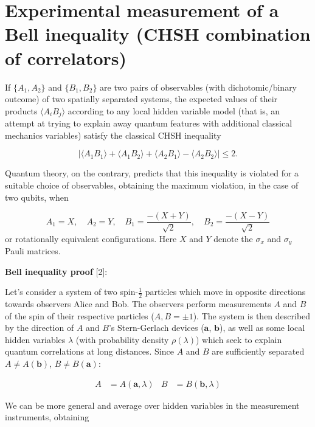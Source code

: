 \documentclass[11pt,dvipsnames]{article}
\begin{document}
    \section*{\texorpdfstring{\textbf{Experimental measurement of a
Bell inequality (CHSH combination of
correlators)}}{Experimental measurement of a Bell inequality   (CHSH combination of correlators)}}\label{experimental-measurement-of-a-bell-inequality-chsh-combination-of-correlators}

{\color{teal}If \(\{A_1, A_2\}\) and \(\{B_1,B_2\}\) are two pairs of observables
(with dichotomic/binary outcome) of two spatially separated systems, the
expected values of their products \(\langle A_i B_j \rangle\) according
to any local hidden variable model (that is, an attempt at trying to
explain away quantum features with additional classical mechanics
variables) satisfy the classical CHSH inequality

\[
|\langle A_1 B_1\rangle +\langle A_1 B_2\rangle + \langle A_2 B_1\rangle - \langle A_2 B_2\rangle|\leq 2 .
\]

Quantum theory, on the contrary, predicts that this inequality is
violated for a suitable choice of observables, obtaining the maximum
violation, in the case of two qubits, when

\[
A_1=X,\quad A_2=Y, \quad B_1=\frac{-(X+Y)}{\sqrt{2}}, \quad B_2=\frac{-(X-Y)}{\sqrt{2}}
\] or rotationally equivalent configurations. Here \(X\) and \(Y\)
denote the \(\sigma_x\) and \(\sigma_y\) Pauli matrices.}

\textbf{Bell inequality proof} [2]:

Let's consider a system of two spin-$\tfrac{1}{2}$ particles which move in opposite directions towards observers Alice and Bob. The observers perform measurements $A$ and $B$ of the spin of their respective particles ($A,B=\pm1$). The system is then described by the direction of $A$ and $B$'s Stern-Gerlach devices ($\mathbf{a}$, $\mathbf{b}$), as well as some local hidden variables $\lambda$ (with probability density $\rho(\lambda)$) which seek to explain quantum correlations at long distances. Since $A$ and $B$ are sufficiently separated $A\neq A(\mathbf{b})$, $B\neq B(\mathbf{a})$:

$$
\begin{aligned}
A &= A(\mathbf{a}, \lambda) & B &= B(\mathbf{b}, \lambda)
\end{aligned}
$$

We can be more general and average over hidden variables in the measurement instruments, obtaining
\end{document}
